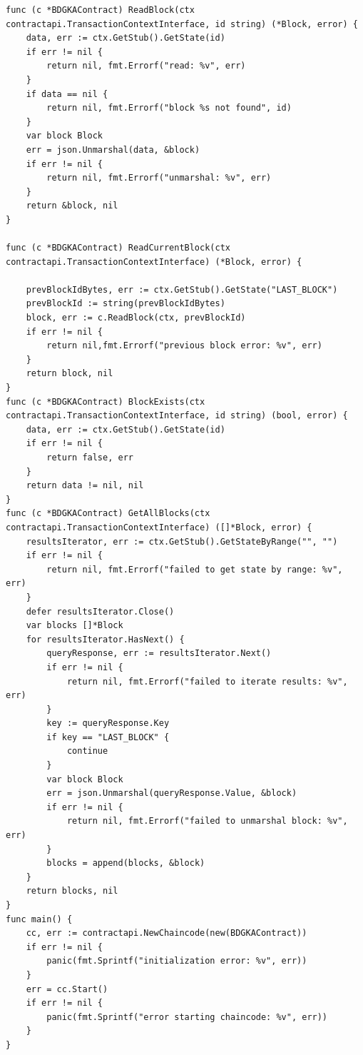 \documentclass[12pt,a4paper]{report}
\begin{document}
\begin{verbatim}
func (c *BDGKAContract) ReadBlock(ctx contractapi.TransactionContextInterface, id string) (*Block, error) {
	data, err := ctx.GetStub().GetState(id)
	if err != nil {
		return nil, fmt.Errorf("read: %v", err)
	}
	if data == nil {
		return nil, fmt.Errorf("block %s not found", id)
	}
	var block Block
	err = json.Unmarshal(data, &block)
	if err != nil {
		return nil, fmt.Errorf("unmarshal: %v", err)
	}
	return &block, nil
}

func (c *BDGKAContract) ReadCurrentBlock(ctx contractapi.TransactionContextInterface) (*Block, error) {

	prevBlockIdBytes, err := ctx.GetStub().GetState("LAST_BLOCK")
	prevBlockId := string(prevBlockIdBytes)
	block, err := c.ReadBlock(ctx, prevBlockId)
	if err != nil {
		return nil,fmt.Errorf("previous block error: %v", err)
	}
	return block, nil
}
func (c *BDGKAContract) BlockExists(ctx contractapi.TransactionContextInterface, id string) (bool, error) {
	data, err := ctx.GetStub().GetState(id)
	if err != nil {
		return false, err
	}
	return data != nil, nil
}
func (c *BDGKAContract) GetAllBlocks(ctx contractapi.TransactionContextInterface) ([]*Block, error) {
	resultsIterator, err := ctx.GetStub().GetStateByRange("", "")
	if err != nil {
		return nil, fmt.Errorf("failed to get state by range: %v", err)
	}
	defer resultsIterator.Close()
	var blocks []*Block
	for resultsIterator.HasNext() {
		queryResponse, err := resultsIterator.Next()
		if err != nil {
			return nil, fmt.Errorf("failed to iterate results: %v", err)
		}
		key := queryResponse.Key
		if key == "LAST_BLOCK" {
			continue
		}
		var block Block
		err = json.Unmarshal(queryResponse.Value, &block)
		if err != nil {
			return nil, fmt.Errorf("failed to unmarshal block: %v", err)
		}
		blocks = append(blocks, &block)
	}
	return blocks, nil
}
func main() {
	cc, err := contractapi.NewChaincode(new(BDGKAContract))
	if err != nil {
		panic(fmt.Sprintf("initialization error: %v", err))
	}
	err = cc.Start()
	if err != nil {
		panic(fmt.Sprintf("error starting chaincode: %v", err))
	}
}
\end{verbatim}
\end{document}
